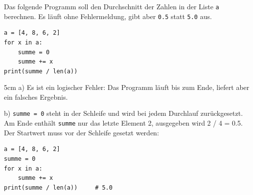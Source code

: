 \question[4]
Das folgende Programm soll den Durchschnitt der Zahlen in der Liste \texttt{a} berechnen.
Es läuft ohne Fehlermeldung, gibt aber \texttt{0.5} statt \texttt{5.0} aus.
\begin{lstlisting}
a = [4, 8, 6, 2]
for x in a:
    summe = 0
    summe += x
print(summe / len(a))
\end{lstlisting}

\begin{solutionbox}{5cm}
a) Es ist ein logischer Fehler: Das Programm läuft bis zum Ende, liefert aber ein falsches Ergebnis.

b) \texttt{summe = 0} steht in der Schleife und wird bei jedem Durchlauf zurückgesetzt.
Am Ende enthält \texttt{summe} nur das letzte Element 2, ausgegeben wird 2 / 4 = 0.5.
Der Startwert muss vor der Schleife gesetzt werden:
\begin{lstlisting}
a = [4, 8, 6, 2]
summe = 0
for x in a:
    summe += x
print(summe / len(a))     # 5.0
\end{lstlisting}
\end{solutionbox}
